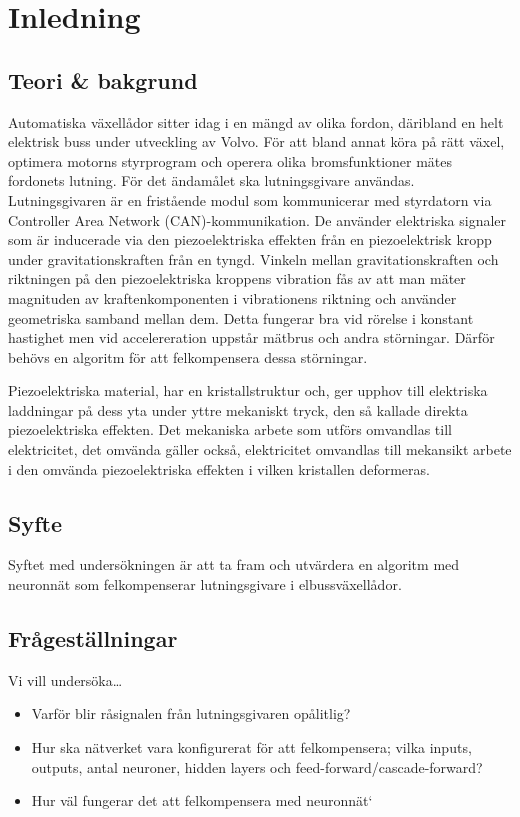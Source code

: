 \section{Inledning}
\subsection{Teori \& bakgrund}

Automatiska växellådor sitter idag i en mängd av olika fordon,
däribland en helt elektrisk buss under utveckling av Volvo.
För att bland annat köra på rätt växel, optimera motorns styrprogram
och operera olika bromsfunktioner %
mätes fordonets lutning.
För det ändamålet ska lutningsgivare användas.
Lutningsgivaren är en fristående modul som kommunicerar med styrdatorn via
Controller Area Network (CAN)-kommunikation.
De använder elektriska signaler som är
inducerade via den piezoelektriska effekten från en piezoelektrisk kropp
under gravitationskraften från en tyngd.
Vinkeln mellan gravitationskraften och
riktningen på den piezoelektriska kroppens vibration
fås av att man mäter magnituden av kraftenkomponenten i vibrationens riktning
och använder geometriska samband mellan dem.
\autocite{chiang00}
Detta fungerar bra vid rörelse i konstant hastighet
men vid accelereration uppstår mätbrus och andra störningar.
Därför behövs en algoritm för att felkompensera dessa störningar.


Piezoelektriska material, har en kristallstruktur och, ger upphov till
elektriska laddningar på dess yta under yttre mekaniskt tryck, den så kallade
direkta piezoelektriska effekten.
Det mekaniska arbete som utförs omvandlas till elektricitet, det omvända gäller
också, elektricitet omvandlas till mekansikt arbete i den omvända
piezoelektriska effekten i vilken kristallen deformeras.
\autocite{electronicdesign2016}

\subsection{Syfte}
Syftet med undersökningen är att ta fram och utvärdera en algoritm med neuronnät som felkompenserar lutningsgivare i elbussväxellådor.

\subsection{Frågeställningar}
Vi vill undersöka\ldots
\begin{itemize}
	\item Varför blir råsignalen från lutningsgivaren opålitlig?
	\item Hur ska nätverket vara konfigurerat för att felkompensera; vilka inputs,
		outputs, antal neuroner, hidden layers och feed-forward/cascade-forward?
	\item Hur väl fungerar det att felkompensera med neuronnät`
\end{itemize}
